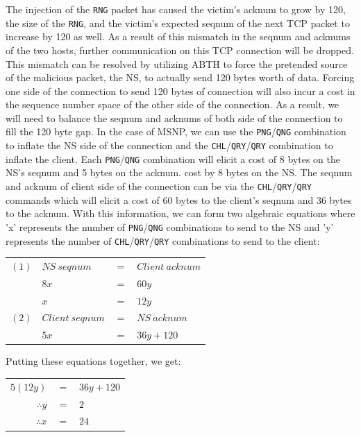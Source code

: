 \documentclass{sig-alternate}
\begin{document}
The injection of the \texttt{RNG} packet has caused the victim's acknum to grow by 120, the size of the \texttt{RNG}, and the victim's expected seqnum of the next TCP packet to increase by 120 as well.
As a result of this mismatch in the seqnum and acknums of the two hosts, further communication on this TCP connection will be dropped. 
This mismatch can be resolved by utilizing ABTH to force the pretended source of the malicious packet, the NS, to actually send 120 bytes worth of data.
Forcing one side of the connection to send 120 bytes of connection will also incur a cost in the sequence number space of the other side of the connection.
As a result, we will need to balance the seqnum and acknums of both side of the connection to fill the 120 byte gap.
In the case of MSNP, we can use the \texttt{PNG}/\texttt{QNG} combination to inflate the NS side of the connection and the \texttt{CHL}/\texttt{QRY}/\texttt{QRY} combination to inflate the client.
Each \texttt{PNG}/\texttt{QNG} combination will elicit a cost of 8 bytes on the NS's seqnum and 5 bytes on the acknum.
cost by 8 bytes on the NS. 
The seqnum and acknum of client side of the connection can be via the \texttt{CHL}/\texttt{QRY}/\texttt{QRY} commands which will elicit a cost of 60 bytes to the client's seqnum and 36 bytes to the acknum. 
With this information, we can form two algebraic equations where 'x' represents the number of \texttt{PNG}/\texttt{QNG} combinations to send to the NS and 'y' represents the number of \texttt{CHL}/\texttt{QRY}/\texttt{QRY} combinations to send to the client:

\begin{tabular}{ r l c l }
\((1)\) &   \(NS~seqnum\)    &   \(=\)    &\(Client~acknum\) \\
        &   \(8x\)           &   \(=\)    &\(60y\) \\
        &   \(x\)            &   \(=\)    &\(12y\) \\
\((2)\) &   \(Client~seqnum\)&   \(=\)    &\(NS~acknum\) \\
        &   \(5x\)           &   \(=\)    &\(36y+120\)
\end{tabular}

Putting these equations together, we get:

\begin{tabular}{ r c l }
\(5(12y)\)       &   \(=\)    &\(36y+120\) \\
\(\therefore y\) &   \(=\)    &\(2\) \\
\(\therefore x\) &   \(=\)    &\(24\)
\end{tabular}
\end{document}
